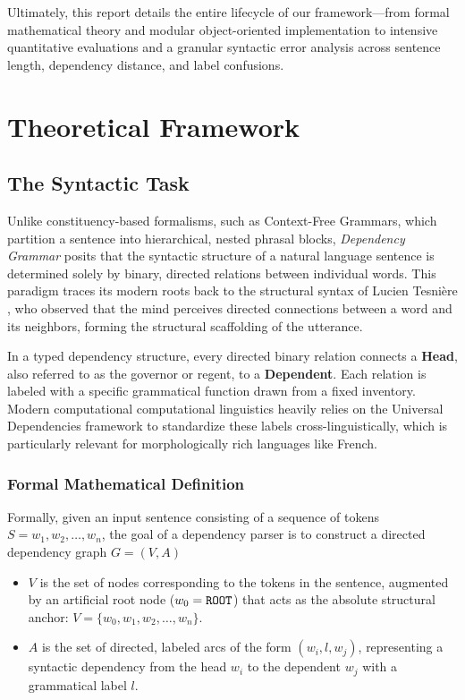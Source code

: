 \documentclass[12pt,a4paper]{article}
\begin{document}
Ultimately, this report details the entire lifecycle of our framework—from formal mathematical theory and modular object-oriented implementation to intensive quantitative evaluations and a granular syntactic error analysis across sentence length, dependency distance, and label confusions.

\section{Theoretical Framework}
\label{sec:theoretical_framework}

\subsection{The Syntactic Task}
\label{subsec:dependency_parsing_task}

Unlike constituency-based formalisms, such as Context-Free Grammars, which partition a sentence into hierarchical, nested phrasal blocks, \textit{Dependency Grammar} posits that the syntactic structure of a natural language sentence is determined solely by binary, directed relations between individual words. This paradigm traces its modern roots back to the structural syntax of Lucien Tesnière \cite{tesniere1959elements}, who observed that the mind perceives directed connections between a word and its neighbors, forming the structural scaffolding of the utterance.

In a typed dependency structure, every directed binary relation connects a \textbf{Head}, also referred to as the governor or regent, to a \textbf{Dependent}. Each relation is labeled with a specific grammatical function drawn from a fixed inventory. Modern computational computational linguistics heavily relies on the Universal Dependencies framework to standardize these labels cross-linguistically, which is particularly relevant for morphologically rich languages like French.

\subsubsection{Formal Mathematical Definition}
\label{subsubsec:formal_mathematical_definition}

Formally, given an input sentence consisting of a sequence of tokens $S = w_1, w_2, \dots, w_n$, the goal of a dependency parser is to construct a directed dependency graph $G = (V, A)$ 
\begin{itemize}
    \item $V$ is the set of nodes corresponding to the tokens in the sentence, augmented by an artificial root node ($w_0 = \text{\texttt{ROOT}}$) that acts as the absolute structural anchor: $V = \{w_0, w_1, w_2, \dots, w_n\}$.
    \item $A$ is the set of directed, labeled arcs of the form $(w_i, l, w_j)$, representing a syntactic dependency from the head $w_i$ to the dependent $w_j$ with a grammatical label $l$.
\end{itemize}
\end{document}
